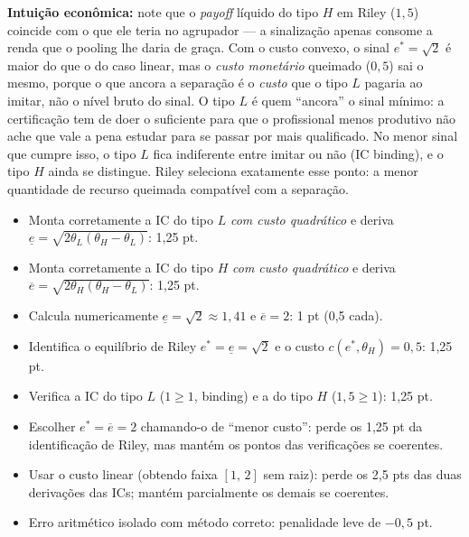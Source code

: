 \begin{solucao}
\textbf{Intui\c{c}\~ao econ\^omica:} note que o \emph{payoff} l\'iquido do tipo $H$ em Riley ($1{,}5$) coincide com o que ele teria no agrupador --- a sinaliza\c{c}\~ao apenas consome a renda que o pooling lhe daria de gra\c{c}a. Com o custo convexo, o sinal $e^{*}=\sqrt{2}$ \'e maior do que o do caso linear, mas o \emph{custo monet\'ario} queimado ($0{,}5$) sai o mesmo, porque o que ancora a separa\c{c}\~ao \'e o \emph{custo} que o tipo $L$ pagaria ao imitar, n\~ao o n\'ivel bruto do sinal. O tipo $L$ \'e quem ``ancora'' o sinal m\'inimo: a certifica\c{c}\~ao tem de doer o suficiente para que o profissional menos produtivo n\~ao ache que vale a pena estudar para se passar por mais qualificado. No menor sinal que cumpre isso, o tipo $L$ fica indiferente entre imitar ou n\~ao (IC binding), e o tipo $H$ ainda se distingue. Riley seleciona exatamente esse ponto: a menor quantidade de recurso queimada compat\'ivel com a separa\c{c}\~ao.
\rubricalabel
\begin{itemize}
\item Monta corretamente a IC do tipo $L$ \emph{com custo quadr\'atico} e deriva $\underline e=\sqrt{2\theta_L(\theta_H-\theta_L)}$: 1{,}25 pt.
\item Monta corretamente a IC do tipo $H$ \emph{com custo quadr\'atico} e deriva $\overline e=\sqrt{2\theta_H(\theta_H-\theta_L)}$: 1{,}25 pt.
\item Calcula numericamente $\underline e=\sqrt{2}\approx 1{,}41$ e $\overline e=2$: 1 pt (0{,}5 cada).
\item Identifica o equil\'ibrio de Riley $e^{*}=\underline e=\sqrt{2}$ e o custo $c(e^{*},\theta_H)=0{,}5$: 1{,}25 pt.
\item Verifica a IC do tipo $L$ ($1\ge 1$, binding) e a do tipo $H$ ($1{,}5\ge 1$): 1{,}25 pt.
\item Escolher $e^{*}=\overline e=2$ chamando-o de ``menor custo'': perde os 1{,}25 pt da identifica\c{c}\~ao de Riley, mas mant\'em os pontos das verifica\c{c}\~oes se coerentes.
\item Usar o custo linear (obtendo faixa $[1,\,2]$ sem raiz): perde os 2{,}5 pts das duas deriva\c{c}\~oes das ICs; mant\'em parcialmente os demais se coerentes.
\item Erro aritm\'etico isolado com m\'etodo correto: penalidade leve de $-0{,}5$ pt.
\end{itemize}
\end{solucao}

